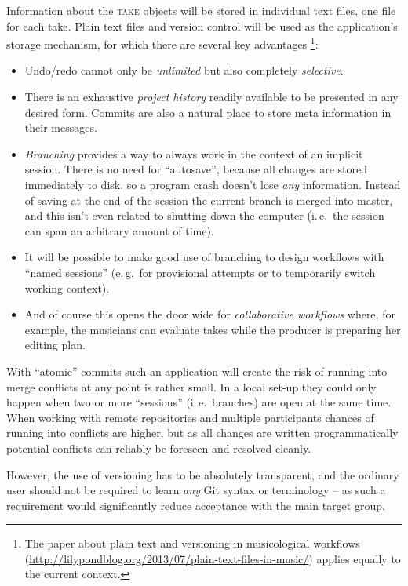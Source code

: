 \documentclass[11pt,a4paper]{article}
\newcommand*{\term}[1]{\textsc{#1}}
\begin{document}
Information about the \term{take} objects will be stored in individual
text files, one file for each take. Plain text files and version control 
will be used as the application's storage mechanism, for which there are
several key advantages%
\footnote{The paper about plain text and versioning in musicological workflows
(\url{http://lilypondblog.org/2013/07/plain-text-files-in-music/}) applies
equally to the current context.}:
\begin{itemize}
\item Undo/redo cannot only be \emph{unlimited} but also completely
\emph{selective}.
\item There is an exhaustive \emph{project history} readily available to be
presented in any desired form.
Commits are also a natural place to store meta information in their messages.
\item \emph{Branching} provides a way to always work in the context of an
implicit session.
There is no need for “autosave”, because all changes are stored immediately to
disk, so a program crash doesn't lose \emph{any} information.
Instead of saving at the end of the session the current branch is merged into
master, and this isn't even related to shutting down the computer (i.\,e.\ the session can span an arbitrary amount of time).
\item It will be possible to make good use of branching to design workflows with
“named sessions” (e.\,g.\ for provisional attempts or to temporarily switch working context).
\item And of course this opens the door wide for \emph{collaborative
workflows} where, for example, the musicians can evaluate takes while the producer
is preparing her editing plan.
\end{itemize}

With “atomic” commits such an application will create the risk of running into merge conflicts at any point is rather small.
In a local set-up they could only happen when two or more “sessions” (i.\,e.\
branches) are open at the same time.
When working with remote repositories and multiple participants chances of
running into conflicts are higher, but as all changes are written
programmatically potential conflicts can reliably be foreseen and resolved cleanly.

However, the use of versioning has to be absolutely transparent, and the ordinary user should not be required to learn \emph{any} Git syntax or terminology -- as
such a requirement would significantly reduce acceptance with the main target
group.
\end{document}
